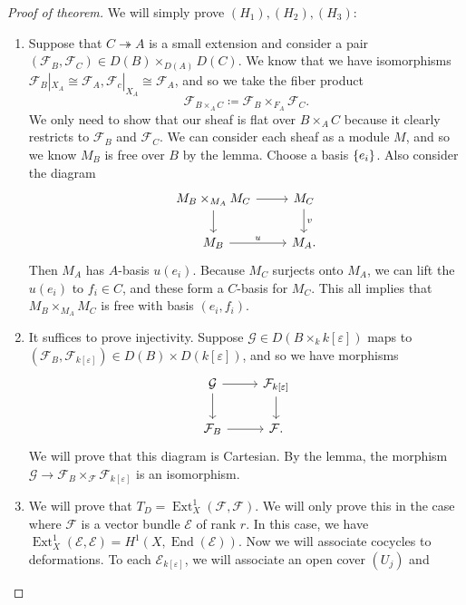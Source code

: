 \documentclass[leqno, openany]{memoir}
\theoremstyle{definition}
\theoremstyle{remark}
\theoremstyle{plain}
\theoremstyle{definition}
\theoremstyle{remark}
\newcommand{\ep}{\varepsilon}
\newcommand{\mc}[1]{\mathcal{#1}}
\DeclareMathOperator{\Ext}{Ext}
\DeclareMathOperator{\End}{End}
\begin{document}
\begin{proof}[Proof of theorem]
    We will simply prove $(H_1), (H_2), (H_3)$:
    \begin{enumerate}
        \item Suppose that $C \twoheadrightarrow A$ is a small extension and consider a pair $(\mc{F}_B, \mc{F}_C) \in D(B) \times_{D(A)} D(C)$. We know that we have isomorphisms $\mc{F}_B |_{X_A} \cong \mc{F}_A, \mc{F}_c |_{X_A} \cong \mc{F}_A$, and so we take the fiber product
            \[ \mc{F}_{B \times_A C} \coloneqq \mc{F}_B \times_{F_A} \mc{F}_C. \]
            We only need to show that our sheaf is flat over $B \times_A C$ because it clearly restricts to $\mc{F}_B$ and $\mc{F}_C$. We can consider each sheaf as a module $M$, and so we know $M_B$ is free over $B$ by the lemma. Choose a basis $\qty{e_i}$. Also consider the diagram
            \begin{equation*}
            \begin{tikzcd}
                M_B \times_{M_A} M_C \ar{r} \ar{d} & M_C \ar{d}{v} \\
                M_B \ar{r}{u} & M_A.
            \end{tikzcd}
            \end{equation*}
            Then $M_A$ has $A$-basis $u(e_i)$. Because $M_C$ surjects onto $M_A$, we can lift the $u(e_i)$ to $f_i \in C$, and these form a $C$-basis for $M_C$. This all implies that $M_B \times_{M_A} M_C$ is free with basis $(e_i, f_i)$.
        \item It suffices to prove injectivity. Suppose $\mc{G} \in D(B \times_k k[\ep])$ maps to $(\mc{F}_B, \mc{F}_{k[\ep]}) \in D(B) \times D(k[\ep])$, and so we have morphisms
            \begin{equation*}
            \begin{tikzcd}
                \mc{G} \ar{r} \ar{d} & \mc{F}_{k[\ep]} \ar{d} \\
                \mc{F}_B \ar{r} & \mc{F}.
            \end{tikzcd}
            \end{equation*}
            We will prove that this diagram is Cartesian. By the lemma, the morphism $\mc{G} \to \mc{F}_B \times_{\mc{F}} \mc{F}_{k[\ep]}$ is an isomorphism.
        \item We will prove that $T_D = \Ext_X^1(\mc{F}, \mc{F})$. We will only prove this in the case where $\mc{F}$ is a vector bundle $\mc{E}$ of rank $r$. In this case, we have $\Ext_X^1(\mc{E}, \mc{E}) = H^1(X, \End(\mc{E}))$. Now we will associate cocycles to deformations. To each $\mc{E}_{k[\ep]}$, we will associate an open cover $(U_j)$ and 

\end{enumerate}
\end{proof}
\end{document}
